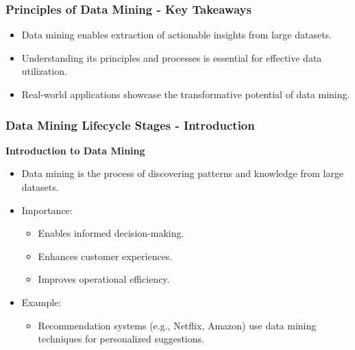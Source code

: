 \documentclass[aspectratio=169]{beamer}
\begin{document}
\begin{frame}[fragile]
    \frametitle{Principles of Data Mining - Key Takeaways}
    \begin{itemize}
        \item Data mining enables extraction of actionable insights from large datasets.
        \item Understanding its principles and processes is essential for effective data utilization.
        \item Real-world applications showcase the transformative potential of data mining.
    \end{itemize}
\end{frame}

\begin{frame}[fragile]
    \frametitle{Data Mining Lifecycle Stages - Introduction}
    \textbf{Introduction to Data Mining}
    
    \begin{itemize}
        \item Data mining is the process of discovering patterns and knowledge from large datasets.
        \item Importance:
        \begin{itemize}
            \item Enables informed decision-making.
            \item Enhances customer experiences.
            \item Improves operational efficiency.
        \end{itemize}
        \item Example: 
        \begin{itemize}
            \item Recommendation systems (e.g., Netflix, Amazon) use data mining techniques for personalized suggestions.
        \end{itemize}
    \end{itemize}
\end{frame}
\end{document}
